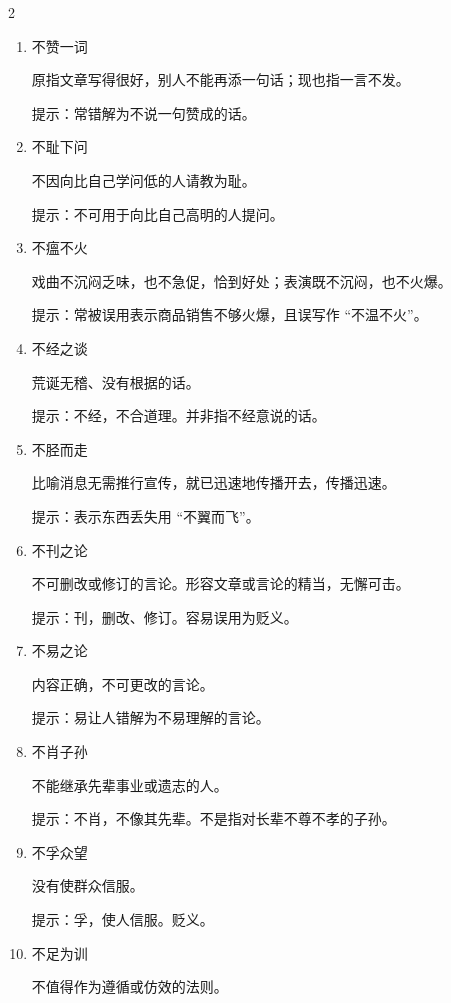 \documentclass[final,oneside]{ctexbook}
\begin{document}
\begin{multicols}{2}
\begin{enumerate}
    \item 不赞一词

      原指文章写得很好，别人不能再添一句话；现也指一言不发。

      提示：常错解为不说一句赞成的话。

    \item 不耻下问

      不因向比自己学问低的人请教为耻。

      提示：不可用于向比自己高明的人提问。

    \item 不瘟不火

      戏曲不沉闷乏味，也不急促，恰到好处；表演既不沉闷，也不火爆。

      提示：常被误用表示商品销售不够火爆，且误写作 “不温不火”。

    \item 不经之谈

      荒诞无稽、没有根据的话。

      提示：不经，不合道理。并非指不经意说的话。

    \item 不胫而走

      比喻消息无需推行宣传，就已迅速地传播开去，传播迅速。

      提示：表示东西丢失用 “不翼而飞”。

    \item 不刊之论

      不可删改或修订的言论。形容文章或言论的精当，无懈可击。

      提示：刊，删改、修订。容易误用为贬义。

    \item 不易之论

      内容正确，不可更改的言论。

      提示：易让人错解为不易理解的言论。

    \item 不肖子孙

      不能继承先辈事业或遗志的人。

      提示：不肖，不像其先辈。不是指对长辈不尊不孝的子孙。

    \item 不孚众望

      没有使群众信服。

      提示：孚，使人信服。贬义。

    \item 不足为训

      不值得作为遵循或仿效的法则。


\end{enumerate}
\end{multicols}
\end{document}

